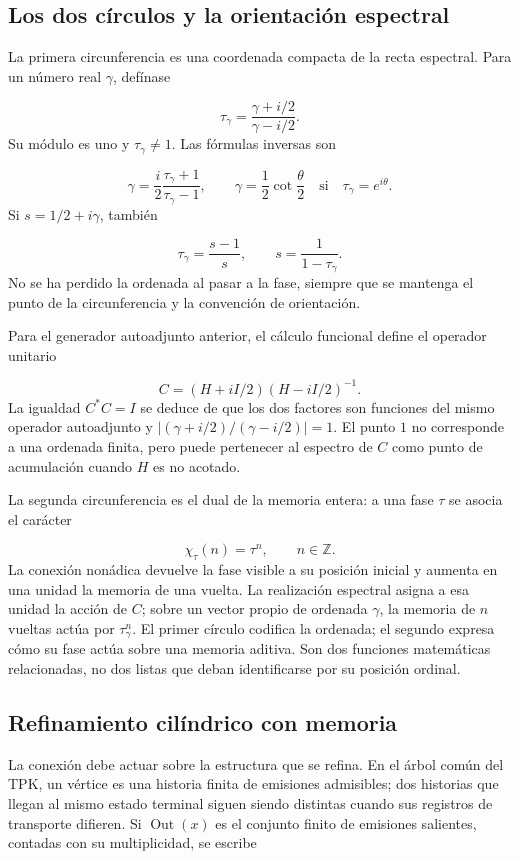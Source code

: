 \subsection{Los dos círculos y la orientación espectral}
\label{rz:circulos}
La primera circunferencia es una coordenada compacta de la recta espectral. Para un número real \(\gamma\), defínase

\[
\tau_\gamma=\frac{\gamma+i/2}{\gamma-i/2}.
\]
Su módulo es uno y \(\tau_\gamma\neq1\). Las fórmulas inversas son

\[
\gamma=\frac{i}{2}\frac{\tau_\gamma+1}{\tau_\gamma-1},
\qquad
\gamma=\frac12\cot\frac{\theta}{2}
\quad\text{si}\quad\tau_\gamma=e^{i\theta}.
\]
Si \(s=1/2+i\gamma\), también

\[
\tau_\gamma=\frac{s-1}{s},\qquad s=\frac1{1-\tau_\gamma}.
\]
No se ha perdido la ordenada al pasar a la fase, siempre que se mantenga el punto de la circunferencia y la convención de orientación.

Para el generador autoadjunto anterior, el cálculo funcional define el operador unitario

\[
C=(H+iI/2)(H-iI/2)^{-1}.
\]
La igualdad \(C^*C=I\) se deduce de que los dos factores son funciones del mismo operador autoadjunto y \(|(\gamma+i/2)/(\gamma-i/2)|=1\). El punto \(1\) no corresponde a una ordenada finita, pero puede pertenecer al espectro de \(C\) como punto de acumulación cuando \(H\) es no acotado.

La segunda circunferencia es el dual de la memoria entera: a una fase \(\tau\) se asocia el carácter

\[
\chi_\tau(n)=\tau^n,\qquad n\in\mathbb Z.
\]
La conexión nonádica devuelve la fase visible a su posición inicial y aumenta en una unidad la memoria de una vuelta. La realización espectral asigna a esa unidad la acción de \(C\); sobre un vector propio de ordenada \(\gamma\), la memoria de \(n\) vueltas actúa por \(\tau_\gamma^n\). El primer círculo codifica la ordenada; el segundo expresa cómo su fase actúa sobre una memoria aditiva. Son dos funciones matemáticas relacionadas, no dos listas que deban identificarse por su posición ordinal.

\subsection{Refinamiento cilíndrico con memoria}
\label{rz:refinamiento}
La conexión debe actuar sobre la estructura que se refina. En el árbol común del TPK, un vértice es una historia finita de emisiones admisibles; dos historias que llegan al mismo estado terminal siguen siendo distintas cuando sus registros de transporte difieren. Si \(\operatorname{Out}(x)\) es el conjunto finito de emisiones salientes, contadas con su multiplicidad, se escribe


